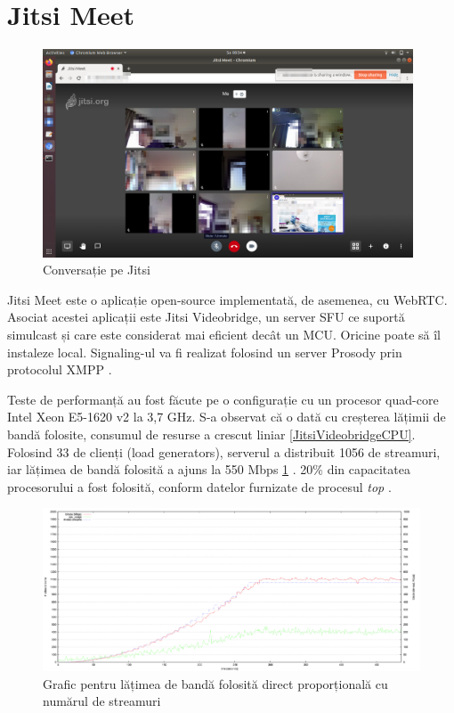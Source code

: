 \section{Jitsi Meet}
\label{chap:ch4sec2}
\begin{figure}[!htbp]
    \centering
    \includegraphics[width=11cm]{figures/jitsi_meet_call.png}
    \caption{Conversație pe Jitsi}
\end{figure}
\indent \par Jitsi Meet este o aplicație open-source implementată, de asemenea, cu WebRTC. Asociat acestei aplicații este Jitsi Videobridge, un server SFU ce suportă simulcast și care este considerat mai eficient decât un MCU. Oricine poate să îl instaleze local. Signaling-ul va fi realizat folosind un server Prosody prin protocolul XMPP \cite{JitsiArchitecture}.
\indent \par Teste de performanță au fost făcute pe o configurație cu un procesor quad-core Intel Xeon E5-1620 v2 la 3,7 GHz. S-a observat că o dată cu creșterea lățimii de bandă folosite, consumul de resurse a crescut liniar \ref{JitsiVideobridgeCPU}.  Folosind 33 de clienți (load generators), serverul a distribuit 1056 de streamuri, iar lățimea de bandă folosită a ajuns la 550 Mbps \ref{JitsiVideobridgeBandwidth} \cite{JitsiVideobridge}. 20\% din capacitatea procesorului a fost folosită, conform datelor furnizate de procesul \textit{top} \cite{JitsiVideobridge}.
\begin{figure}[H]
    \centering
    \includegraphics[width=15cm]{figures/jitsi_videobridge_bandwidth.png}
    \caption{Grafic pentru lățimea de bandă folosită direct proporțională cu numărul de streamuri}
    \label{JitsiVideobridgeBandwidth}
\end{figure}
